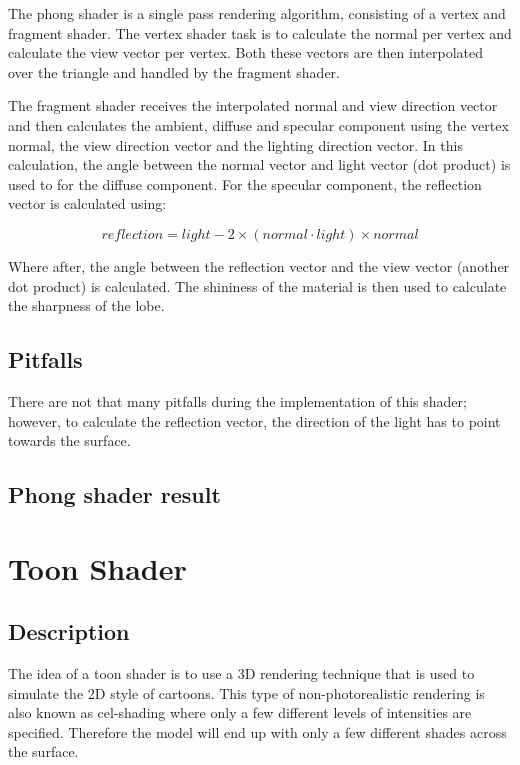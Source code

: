 \documentclass[a4paper,12pt]{article}
\begin{document}
The phong shader is a single pass rendering algorithm, consisting of a vertex and fragment shader. The vertex shader task is to calculate the normal per vertex and calculate the view vector per vertex. Both these vectors are then interpolated over the triangle and handled by the fragment shader.

The fragment shader receives the interpolated normal and view direction vector and then calculates the ambient, diffuse and specular component using the vertex normal, the view direction vector and the lighting direction vector. In this calculation, the angle between the normal vector and light vector (dot product) is used to for the diffuse component. For the specular component, the reflection vector is calculated using:

	\[ reflection = light-2 \times (normal \cdot light) \times normal \]

Where after, the angle between the reflection vector and the view vector (another dot product) is calculated. The shininess of the material is then used to calculate the sharpness of the lobe.

\subsection{Pitfalls}
\label{sec:PitfallsPhongShader}

There are not that many pitfalls during the implementation of this shader; however, to calculate the reflection vector, the direction of the light has to point towards the surface.

\subsection{Phong shader result}
\label{sec:PhongShaderResult}


\section{Toon Shader}
\label{sec:ToonShader}
\subsection{Description}
\label{sec:DescriptionToonShader}

The idea of a toon shader is to use a 3D rendering technique that is used to simulate the 2D style of cartoons. This type of non-photorealistic rendering is also known as cel-shading where only a few different levels of intensities are specified. Therefore the model will end up with only a few different shades across the surface.
\end{document}
